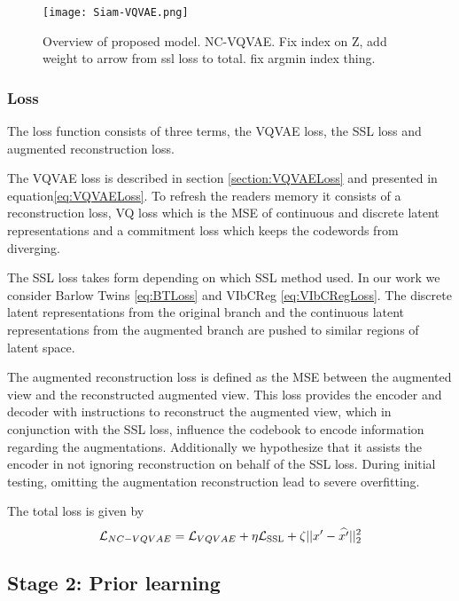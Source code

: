 \documentclass[../../thesis.tex]{subfiles}
\begin{document}
\begin{figure}[h]
    \label{fig:NC-VQVAE}
    \texttt{[image: Siam-VQVAE.png]}
    \centering  
    \caption{Overview of proposed model. NC-VQVAE. Fix index on Z, add weight to arrow from ssl loss to total. fix argmin index thing.}
\end{figure}

\subsubsection{Loss}
The loss function consists of three terms, the VQVAE loss, the SSL loss and augmented reconstruction loss.
\newline

The VQVAE loss is described in section \ref{section:VQVAELoss} and presented in equation\ref{eq:VQVAELoss}. To refresh the readers memory it consists of a reconstruction loss, VQ loss which is the MSE of continuous and discrete latent representations and a commitment loss which keeps the codewords from diverging. 
\newline

The SSL loss takes form depending on which SSL method used. In our work we consider Barlow Twins \ref{eq:BTLoss} and VIbCReg \ref{eq:VIbCRegLoss}. The discrete latent representations from the original branch and the continuous latent representations from the augmented branch are pushed to similar regions of latent space.
\newline

The augmented reconstruction loss is defined as the MSE between the augmented view and the reconstructed augmented view. This loss provides the encoder and decoder with instructions to reconstruct the augmented view, which in conjunction with the SSL loss, influence the codebook to encode information regarding the augmentations. Additionally we hypothesize that it assists the encoder in not ignoring reconstruction on behalf of the SSL loss. During initial testing, omitting the augmentation reconstruction lead to severe overfitting.\newline

The total loss is given by 
\begin{equation}
    \mathcal{L}_{NC-VQVAE} = \mathcal{L}_{VQVAE} + \eta\mathcal{L}_{\text{SSL}} + \zeta ||x' - \widehat{x'}||_2^2
\end{equation}

\subsection{Stage 2: Prior learning}
\end{document}
